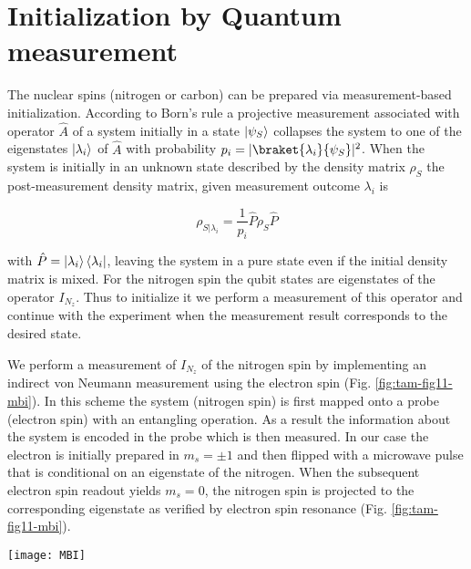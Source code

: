 \section{Initialization by Quantum measurement}
The nuclear spins (nitrogen or carbon) can be prepared via measurement-based initialization\cite{Robledo_Nature_2011}. According to Born's rule a projective measurement associated with operator $\hat{A}$ of a system initially in a state $\left|\psi_S\right>$ collapses the system to one of the eigenstates $\left|\lambda_i\right>$ of $\hat{A}$ with probability $p_i = |\braket{\lambda_i}{\psi_S}|^2$. When the system is initially in an unknown state described by the density matrix $\rho_S$ the post-measurement density matrix, given measurement outcome $\lambda_i$ is

\begin{equation}
\rho_{S|\lambda_i} = \frac{1}{p_i}\hat{P}\rho_S\hat{P}
\end{equation}

with $\hat{P}=\left|\lambda_i\right>\left<\lambda_i\right|$, leaving the system in a pure state even if the initial density matrix is mixed. For the nitrogen spin the qubit states are eigenstates of the operator $I_{N_z}$. Thus to initialize it we perform a measurement of this operator and continue with the experiment when the measurement result corresponds to the desired state.

We perform a measurement of $I_{N_z}$ of the nitrogen spin by implementing an indirect von Neumann measurement using the electron spin (Fig. \ref{fig:tam-fig11-mbi}). In this scheme the system (nitrogen spin) is first mapped onto a probe (electron spin) with an entangling operation. As a result the information about the system is encoded in the probe which is then measured. In our case the electron is initially prepared in $m_s= \pm 1$ and then flipped with a microwave pulse that is conditional on an eigenstate of the nitrogen. When the subsequent electron spin readout yields $m_s = 0$, the nitrogen spin is projected to the corresponding eigenstate as verified by electron spin resonance (Fig. \ref{fig:tam-fig11-mbi}).

\begin{figure*}
	\centering
	\texttt{[image: MBI]}
	\caption{\label{fig:tam-fig11-mbi} \textbf{Measurement-based initialization of the nitrogen spin}. Pulsed electron spin resonance for no initialization of the nitrogen spin (grey) and after performing measurement-based initialization of the nitrogen spin in $m_I = -1$ (red) and $m_I = 0$. The polarization of the nitrogen spin is inferred from the depth of the observed resonances.}
\end{figure*}

